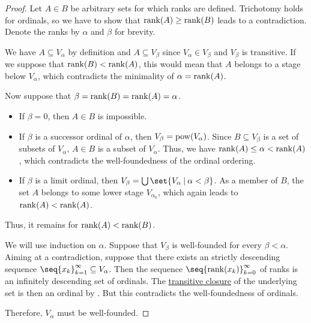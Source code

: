 \begin{proof}
   Let \( A \in B \) be arbitrary sets for which ranks are defined. Trichotomy holds for ordinals, so we have to show that \( \operatorname{rank}(A) \geq \operatorname{rank}(B) \) leads to a contradiction. Denote the ranks by \( \alpha \) and \( \beta \) for brevity.

  We have \( A \subseteq V_\alpha \) by definition and \( A \subseteq V_\beta \) since \( V_\alpha \in V_\beta \) and \( V_\beta \) is transitive. If we suppose that \( \operatorname{rank}(B) < \operatorname{rank}(A) \), this would mean that \( A \) belongs to a stage below \( V_\alpha \), which contradicts the minimality of \( \alpha = \operatorname{rank}(A) \).

  Now suppose that \( \beta = \operatorname{rank}(B) = \operatorname{rank}(A) = \alpha \).
  \begin{itemize}
    \item If \( \beta = 0 \), then \( A \in B \) is impossible.

    \item If \( \beta \) is a successor ordinal of \( \alpha \), then \( V_\beta = \operatorname{pow}(V_\alpha) \). Since \( B \subseteq V_\beta \) is a set of subsets of \( V_\alpha \), \( A \in B \) is a subset of \( V_\alpha \). Thus, we have \( \operatorname{rank}(A) \leq \alpha < \operatorname{rank}(A) \), which contradicts the well-foundedness of the ordinal ordering.

    \item If \( \beta \) is a limit ordinal, then \( V_\beta = \bigcup\set{ V_\alpha \given \alpha < \beta } \). As a member of \( B \), the set \( A \) belongs to some lower stage \( V_{\alpha_0} \), which again leads to \( \operatorname{rank}(A) < \operatorname{rank}(A) \).
  \end{itemize}

  Thus, it remains for \( \operatorname{rank}(A) < \operatorname{rank}(B) \).

   We will use induction on \( \alpha \). Suppose that \( V_\beta \) is well-founded for every \( \beta < \alpha \). Aiming at a contradiction, suppose that there exists an strictly descending sequence \( \seq{ x_k }_{k=1}^\infty \subseteq V_\alpha \). Then the sequence \( \seq{ \rank(x_k) }_{k=0}^\infty \) of ranks is an infinitely descending set of ordinals. The \hyperref[def:transitive_closure_of_a_set]{transitive closure} of the underlying set is then an ordinal by . But this contradicts the well-foundedness of ordinals.

  Therefore, \( V_\alpha \) must be well-founded.


\end{proof}
